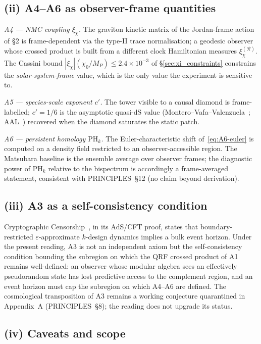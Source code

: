 \subsection*{(ii) A4--A6 as observer-frame quantities}

\emph{A4 --- NMC coupling $\xi_\chi$.} The graviton kinetic matrix of the
Jordan-frame action of \S2 is frame-dependent via the type-II trace
normalisation; a geodesic observer whose crossed product is built from a
different clock Hamiltonian measures $\xi_\chi^{(\mathcal R)}$. The
Cassini bound $|\xi_\chi|(\chi_0/M_P)\le 2.4\times 10^{-3}$ of
\S\ref{sec:xi_constraints} constrains the \emph{solar-system-frame} value,
which is the only value the experiment is sensitive to.

\emph{A5 --- species-scale exponent $c'$.} The tower visible to a causal
diamond is frame-labelled; $c' = 1/6$ is the asymptotic quasi-dS value
(Montero--Vafa--Valenzuela~\cite{Montero2022}; AAL~\cite{AAL2023})
recovered when the diamond saturates the static patch.

\emph{A6 --- persistent homology $\mathrm{PH}_k$.} The Euler-characteristic
shift of~\eqref{eq:A6-euler} is computed on a density field restricted to
an observer-accessible region. The Matsubara baseline is the ensemble
average over observer frames; the diagnostic power of $\mathrm{PH}_k$
relative to the bispectrum is accordingly a frame-averaged statement,
consistent with PRINCIPLES~\S12 (no claim beyond derivation).

\subsection*{(iii) A3 as a self-consistency condition}

Cryptographic Censorship~\cite{CryptoCensorship}, in its AdS/CFT proof,
states that boundary-restricted $\varepsilon$-approximate $k$-design
dynamics implies a bulk event horizon. Under the present reading, A3 is
not an independent axiom but the self-consistency condition bounding the
subregion on which the QRF crossed product of A1 remains well-defined:
an observer whose modular algebra sees an effectively pseudorandom state
has lost predictive access to the complement region, and an event horizon
must cap the subregion on which A4--A6 are defined. The cosmological
transposition of A3 remains a working conjecture quarantined in
Appendix~A (PRINCIPLES~\S8); the reading does not upgrade its status.

\subsection*{(iv) Caveats and scope}

